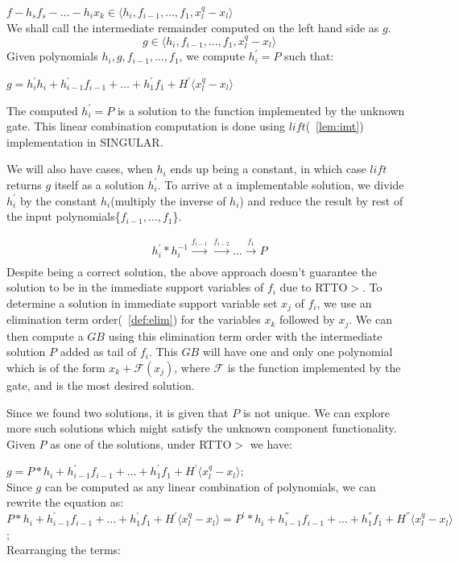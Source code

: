 $f - h_sf_s -\dots-h_ix_k \in \langle h_i,f_{i-1},\dots,f_1, x_l^q-x_l\rangle$\\
We shall call the intermediate remainder computed on the left hand side as $g$.
\begin{equation}
g \in \langle h_i,f_{i-1},\dots,f_1, x_l^q-x_l\rangle
\end{equation}
Given polynomials $h_i, g, f_{i-1},\dots,f_1$, we compute $h_i^{'}=P$ such that:

 $g = h_i^{'}h_i+h_{i-1}^{'}f_{i-1}+\dots+h_1^{'}f_1+H^{'}\langle x_l^q-x_l\rangle$

The computed $h_i^{'} = P$ is a solution to the function implemented by the unknown gate. This linear combination computation is done using $lift$(~\ref{lem:imt}) implementation in SINGULAR\cite{DGPS_410}.

We will also have cases, when $h_i$ ends up being a constant, in which case $lift$ returns $g$ itself as a solution $h_i^{'}$. To arrive at a implementable solution, we divide $h_i^{'}$ by the constant $h_i$(multiply the inverse of $h_i$) and reduce the result by rest of the input polynomials\{$f_{i-1},\dots,f_1$\}. 

\begin{align}
h_i^{'}*h_i^{-1}\xrightarrow[]{f_{i-1}}\xrightarrow[]{f_{i-2}}\dots\xrightarrow[]{f_1}P
\end{align}
Despite being a correct solution, the above approach doesn't guarantee the solution to be in the immediate support variables of $f_i$ due to RTTO$>$. To determine a solution in immediate support variable set $x_j$ of $f_i$, we use an elimination term order(~\ref{def:elim}) for the variables $x_k$ followed by $x_j$. We can then compute a $GB$ using this elimination term order with the intermediate solution $P$ added as tail of $f_i$. This $GB$ will have one and only one polynomial which is of the form $x_k + \mathcal{F}(x_j)$, where $\mathcal{F}$ is the function implemented by the gate, and is the most desired solution. 

Since we found two solutions, it is given that $P$ is not unique. We can explore more such solutions which might satisfy the unknown component functionality. Given $P$ as one of the solutions, under RTTO$>$ we have:

$g = P*h_i+h_{i-1}^{'}f_{i-1}+\dots+h_1^{'}f_1+H^{'}\langle x_l^q-x_l\rangle;$\\
Since $g$ can be computed as any linear combination of polynomials, we can rewrite the equation as:\\
$P*h_i+h_{i-1}^{'}f_{i-1}+\dots+h_1^{'}f_1+H^{'}\langle x_l^q-x_l\rangle = P^{'}*h_i+h_{i-1}^{''}f_{i-1}+\dots+h_1^{''}f_1+H^{''}\langle x_l^q-x_l\rangle$;\\
Rearranging the terms:

